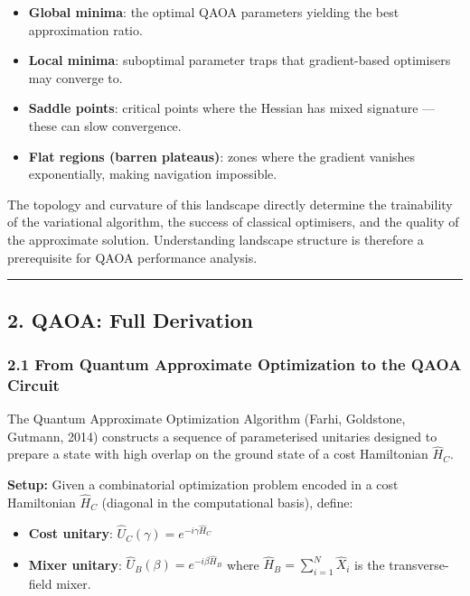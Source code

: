 \documentclass[
  11pt,
]{report}
\providecommand{\tightlist}{%
  \setlength{\itemsep}{0pt}\setlength{\parskip}{0pt}}
\begin{document}
\begin{itemize}
\tightlist
\item
  \textbf{Global minima}: the optimal QAOA parameters yielding the best
  approximation ratio.
\item
  \textbf{Local minima}: suboptimal parameter traps that gradient-based
  optimisers may converge to.
\item
  \textbf{Saddle points}: critical points where the Hessian has mixed
  signature --- these can slow convergence.
\item
  \textbf{Flat regions (barren plateaus)}: zones where the gradient
  vanishes exponentially, making navigation impossible.
\end{itemize}

The topology and curvature of this landscape directly determine the
trainability of the variational algorithm, the success of classical
optimisers, and the quality of the approximate solution. Understanding
landscape structure is therefore a prerequisite for QAOA performance
analysis.

\begin{center}\rule{0.5\linewidth}{0.5pt}\end{center}

\subsection{2. QAOA: Full Derivation}\label{qaoa-full-derivation}

\subsubsection{2.1 From Quantum Approximate Optimization to the QAOA
Circuit}\label{from-quantum-approximate-optimization-to-the-qaoa-circuit}

The Quantum Approximate Optimization Algorithm (Farhi, Goldstone,
Gutmann, 2014) constructs a sequence of parameterised unitaries designed
to prepare a state with high overlap on the ground state of a cost
Hamiltonian \(\hat{H}_C\).

\textbf{Setup:} Given a combinatorial optimization problem encoded in a
cost Hamiltonian \(\hat{H}_C\) (diagonal in the computational basis),
define:

\begin{itemize}
\tightlist
\item
  \textbf{Cost unitary}: \(\hat{U}_C(\gamma) = e^{-i\gamma \hat{H}_C}\)
\item
  \textbf{Mixer unitary}: \(\hat{U}_B(\beta) = e^{-i\beta \hat{H}_B}\)
  where \(\hat{H}_B = \sum_{i=1}^{N} \hat{X}_i\) is the transverse-field
  mixer.
\end{itemize}
\end{document}

